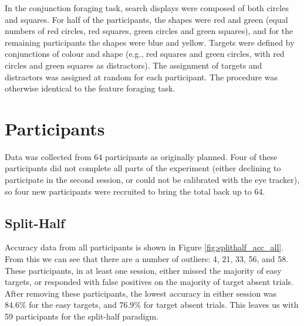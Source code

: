 \documentclass[a4paper, oneside, 11pt, onecolumn]{article}
\begin{document}
In the conjunction foraging task, search displays were composed of both circles and squares. For half of the participants, the shapes were red and green (equal numbers of red circles, red squares, green circles and green squares), and for the remaining participants the shapes were blue and yellow. Targets were defined by conjunctions of colour and shape (e.g., red squares and green circles, with red circles and green squares as distractors). The assignment of targets and distractors was assigned at random for each participant. The procedure was otherwise identical to the feature foraging task. 


\section{Participants}

Data was collected from 64 participants as originally planned. Four of these participants did not complete all parts of the experiment (either declining to participate in the second session, or could not be calibrated with the eye tracker), so four new participants were recruited to bring the total back up to 64. 

\subsection{Split-Half}

Accuracy data from all participants is shown in Figure \ref{fig:splithalf_acc_all}. From this we can see that there are a number of outliers: 4, 21, 33, 56, and 58. These participants, in at least one session, either missed the majority of easy targets, or responded with false positives on the majority of target absent trials. After removing these participants, the lowest accuracy in either session was $84.6\%$ for the easy targets, and $76.9\%$ for target absent trials. This leaves us with 59 participants for the split-half paradigm. 
\end{document}
